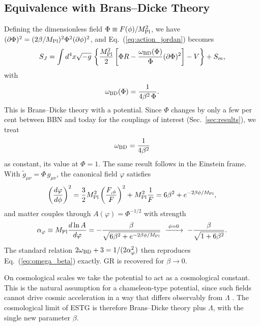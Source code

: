 \documentclass[11pt,a4paper]{article}
\begin{document}
\subsection{Equivalence with Brans--Dicke Theory}
\label{sec:bd}
Defining the dimensionless field $\Phi \equiv F(\phi)/M_{\rm Pl}^2$, we have $(\partial\Phi)^2 = (2\beta/M_{\rm Pl})^2 \Phi^2 (\partial\phi)^2$, and Eq.~(\ref{eq:action_jordan}) becomes
\begin{equation}
S_J = \int d^4x \sqrt{-g}\, \left\{ \frac{M_{\rm Pl}^2}{2}\left[ \Phi R - \frac{\omega_{\rm BD}(\Phi)}{\Phi} (\partial\Phi)^2 \right] - V \right\} + S_m,
\label{eq:bd}
\end{equation}
with
\begin{equation}
\omega_{\rm BD}(\Phi) = \frac{1}{4\beta^2\,\Phi}.
\end{equation}
This is Brans--Dicke theory with a potential. Since $\Phi$ changes by only a few per cent between BBN and today for the couplings of interest (Sec.~\ref{sec:results}), we treat
\begin{equation}
\omega_{\rm BD} = \frac{1}{4\beta^2}
\label{eq:omega_beta}
\end{equation}
as constant, its value at $\Phi = 1$. The same result follows in the Einstein frame. With $\tilde g_{\mu\nu} = \Phi\, g_{\mu\nu}$, the canonical field $\varphi$ satisfies
\begin{equation}
\left( \frac{d\varphi}{d\phi} \right)^2 = \frac{3}{2} M_{\rm Pl}^2 \left( \frac{F_{,\phi}}{F} \right)^2 + M_{\rm Pl}^2\frac{1}{F} = 6\beta^2 + e^{-2\beta\phi/M_{\rm Pl}},
\end{equation}
and matter couples through $A(\varphi) = \Phi^{-1/2}$ with strength
\begin{equation}
\alpha_\varphi \equiv M_{\rm Pl}\frac{d\ln A}{d\varphi} = -\frac{\beta}{\sqrt{6\beta^2 + e^{-2\beta\phi/M_{\rm Pl}}}} \;\xrightarrow{\;\phi = 0\;}\; -\frac{\beta}{\sqrt{1+6\beta^2}} .
\end{equation}
The standard relation $2\omega_{\rm BD} + 3 = 1/(2\alpha_\varphi^2)$ \cite{Damour1992} then reproduces Eq.~(\ref{eq:omega_beta}) exactly. GR is recovered for $\beta \to 0$.

On cosmological scales we take the potential to act as a cosmological constant. This is the natural assumption for a chameleon-type potential, since such fields cannot drive cosmic acceleration in a way that differs observably from $\Lambda$ \cite{WangHuiKhoury2012}. The cosmological limit of ESTG is therefore Brans--Dicke theory plus $\Lambda$, with the single new parameter $\beta$.
\end{document}
